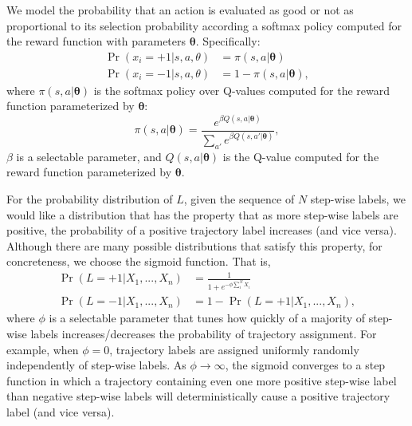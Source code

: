 \documentclass{article}
\begin{document}
We model the probability that an action is evaluated as good or not as proportional to its selection probability according a softmax policy computed for the reward function with parameters $\bm{\theta}$. Specifically:
\begin{align}
\Pr(x_i = +1 | s, a, \theta) &= \pi(s, a | \bm{\theta}) \\
\Pr(x_i = -1 | s, a, \theta) &= 1 - \pi(s, a | \bm{\theta}),
\end{align}
where $\pi(s, a | \bm{\theta})$ is the softmax policy over Q-values computed for the reward function parameterized by $\bm{\theta}$:
\begin{equation}
\pi(s, a | \bm{\theta}) = \frac{e^{\beta Q(s,a | \bm{\theta})}}{\sum_{a'}e^{\beta Q(s,a' | \bm{\theta})}},
\end{equation}
$\beta$ is a selectable parameter, and $Q(s,a|\bm{\theta})$ is the Q-value computed for the reward function parameterized by $\bm{\theta}$.


For the probability distribution of $L$, given the sequence of $N$ step-wise labels, we would like a distribution that has the property that as more step-wise labels are positive, the probability of a positive trajectory label increases (and vice versa). Although there are many possible distributions that satisfy this property, for concreteness, we choose the sigmoid function. That is,
\begin{align}
\Pr(L = +1 | X_1, ..., X_n) &= \frac{1}{1 + e^{-\phi \sum_i^N X_i}} \\
\Pr(L = -1 | X_1, ... ,X_n) &= 1 - \Pr(L = +1 | X_1, ..., X_n),
\end{align}
where $\phi$ is a selectable parameter that tunes how quickly of a majority of step-wise labels increases/decreases the probability of trajectory assignment. For example, when $\phi = 0$, trajectory labels are assigned uniformly randomly independently of step-wise labels. As $\phi \rightarrow \infty$, the sigmoid converges to a step function in which a trajectory containing even one more positive step-wise label than negative step-wise labels will deterministically cause a positive trajectory label (and vice versa).
\end{document}
